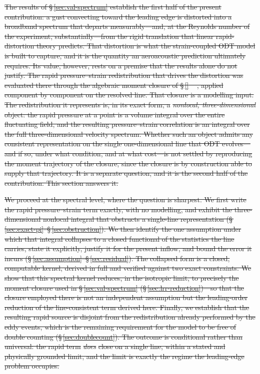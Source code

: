 \documentclass[lineno]{JFM-FLM_Au}
\newcounter{assumption}
\providecommand{\DIFdel}[1]{{\protect\color{red}\sout{#1}}}                      %
\begin{document}
\DIFdel{The results of \S\,\ref{sec:val-spectrum} establish the first half of the
present contribution: a gust convecting toward the leading edge is distorted
into a broadband spectrum that departs measurably---and, at the Reynolds number
of the experiment, substantially---from the rigid translation that linear
rapid-distortion theory predicts. That distortion is what the strain-coupled
ODT model is built to capture, and it is the quantity an aeroacoustic
prediction ultimately requires. Its value, however, rests on a premise that the
results alone do not justify. The rapid pressure--strain redistribution that
drives the distortion was evaluated there through the algebraic moment closure
of \S\,\ref{}%
\mbox{%
\citep{LaunderReeceRodi1975}}\hskip0pt%
, applied component by component on the resolved
line. That closure is a modelling input. The redistribution it represents is,
in its exact form, a }\emph{\DIFdel{nonlocal, three-dimensional}} %
\DIFdel{object: the rapid
pressure at a point is a volume integral over the entire fluctuating field, and
the resulting pressure--strain correlation is an integral over the full
three-dimensional velocity spectrum. Whether such an object admits any
consistent representation on the single one-dimensional line that ODT
evolves---and if so, under what condition, and at what cost---is not settled by
reproducing the moment trajectory of the closure, since the closure is by
construction able to supply that trajectory. It is a separate question, and it
is the second half of the contribution. This section answers it.
}%

\DIFdel{We proceed at the spectral level, where the question is sharpest. We first
write the rapid pressure--strain term exactly, with no modelling, and exhibit
the three-dimensional nonlocal integral that obstructs a single-line
representation (\S\,\ref{sec:exact-pi}--\S\,\ref{sec:obstruction}). We then
identify the one assumption under which that integral collapses to a closed
functional of the statistics the line carries, state it explicitly, justify it
for the present inflow, and bound the error it incurs
(\S\,\ref{sec:assumption}--\S\,\ref{sec:residual}). The collapsed form is a
closed, computable kernel, derived in full and verified against two exact
constraints. We show that this spectral kernel reduces, in the isotropic limit,
to precisely the moment closure used in \S\,\ref{sec:val-spectrum}
(\S\,\ref{sec:lrr-reduction})---so that the closure employed there is not an
independent assumption but the leading-order reduction of the line-consistent
term derived here. Finally, we establish that the resulting rapid source is
disjoint from the redistribution already performed by the eddy events, which is
the remaining requirement for the model to be free of double counting
(\S\,\ref{sec:doublecount}). The outcome is conditional rather than universal:
the rapid term }\emph{\DIFdel{does}} %
\DIFdel{close on a single line, within a stated and
physically grounded limit, and the limit is exactly the regime the
leading-edge problem occupies.
}%
\end{document}
